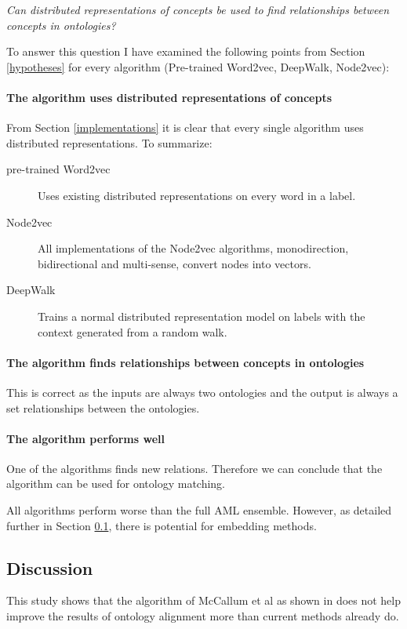 \documentclass{article}
\begin{document}
 \begin{center}
 \textit{
 Can distributed representations of concepts be used to find relationships between concepts in ontologies?
 }
 \end{center}
 
 To answer this question I have examined the following points from Section \ref{hypotheses} for every algorithm (Pre-trained Word2vec, DeepWalk, Node2vec):
 
\paragraph{The algorithm uses distributed representations of concepts}
 From Section \ref{implementations} it is clear that every single algorithm uses distributed representations. To summarize:
\begin{description}
\item[pre-trained Word2vec] Uses existing distributed representations on every word in a label.
\item[Node2vec] All implementations of the Node2vec algorithms, monodirection, bidirectional and multi-sense, convert nodes into vectors.
\item[DeepWalk] Trains a normal distributed representation model on labels with the context generated from a random walk.
\end{description}
\paragraph{The algorithm finds relationships between concepts in ontologies}
This is correct as the inputs are always two ontologies and the output is always a set relationships between the ontologies.
\paragraph{The algorithm performs well}
 One of the algorithms finds new relations. Therefore we can conclude that the algorithm can be used for ontology matching.

 All algorithms perform worse than the full AML ensemble. However, as detailed further in Section \ref{discussion}, there is potential for embedding methods.
 
 \subsection{Discussion} \label{discussion}
  This study shows that the algorithm of McCallum et al as shown in \cite{mccallumweblecture} does not help improve the results of ontology alignment more than current methods already do.
\end{document}

